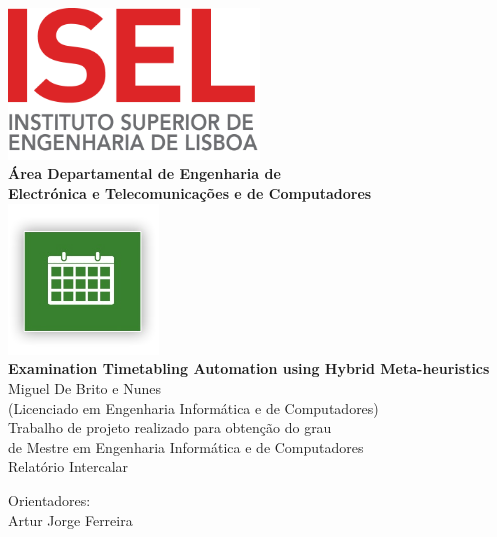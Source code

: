 \begin{titlepage}
	\thispagestyle{empty}
	\begin{center}
		\includegraphics[width=0.5\textwidth,natwidth=720,natheight=434]{./images/LogoIsel3.png} \\[0.5cm]
		{\Large \textbf{Área Departamental de Engenharia de \\Electrónica e Telecomunica\c cões e de Computadores}} \\[0.8cm]		
		\includegraphics[width=0.3\textwidth,natwidth=300,natheight=300]{./images/guide_me_logo.jpg} \\[0.8cm]
		\fontsize{18pt}{10pt}\selectfont
		{\textbf{Examination Timetabling Automation using Hybrid Meta-heuristics}} \\[0.8cm]
		\fontsize{16pt}{10pt}\selectfont
		Miguel De Brito e Nunes\\[0.2cm]
		\fontsize{14pt}{10pt}\selectfont
		(Licenciado em Engenharia Informática e de Computadores)\\[0.8cm]
		\fontsize{12pt}{10pt}\selectfont
		{Trabalho de projeto realizado para obten\c cão do grau\\de Mestre em Engenharia Informática e de Computadores} \\[0.8cm]
		\fontsize{16pt}{10pt}\selectfont
		Relatório Intercalar 
		\vfill
		\begin{tabbing}
		   \fontsize{12pt}{10pt}\selectfont
		   Orientadores: \\
		   \fontsize{11pt}{10pt}\selectfont
		   \hspace{1.1cm}Artur Jorge Ferreira \\

\end{tabbing}
\end{center}
\end{titlepage}
